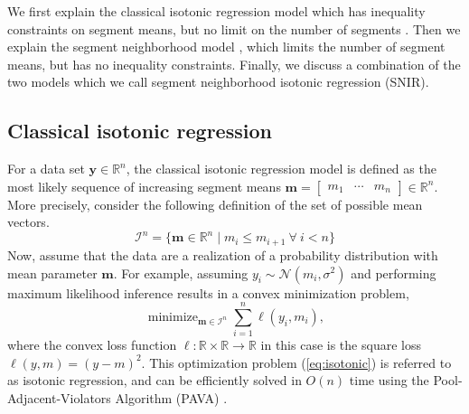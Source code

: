 \documentclass{article}
\DeclareMathOperator*{\Lik}{Lik}
\DeclareMathOperator*{\maximize}{maximize}
\DeclareMathOperator*{\minimize}{minimize}
\newcommand{\RR}{\mathbb R}
\begin{document}
We first explain the classical isotonic regression model which has
inequality constraints on segment means, but no limit on the number of
segments \citep{mair2009isotone}. Then we explain the segment
neighborhood model \citep{segment-neighborhood}, which limits the
number of segment means, but has no inequality constraints. Finally,
we discuss a combination of the two models which we call segment
neighborhood isotonic regression (SNIR).

\subsection{Classical isotonic regression}

For a data set $\mathbf y\in\RR^n$, the classical isotonic regression
model is defined as the most likely sequence of increasing segment
means $\mathbf m = \left[
\begin{array}{ccc}
  m_1& \cdots &m_n
\end{array}
\right]
\in\RR^n$. More precisely, consider the following definition
of the set of possible mean vectors.
\begin{equation}
  \mathcal I^n = \{\mathbf m\in\RR^n \mid m_i \leq m_{i+1} \ \forall\ i<n\}
\end{equation}
Now, assume that the data are a realization of a probability
distribution with mean parameter $\mathbf m$. For example, assuming
$y_i \sim \mathcal N(m_i, \sigma^2)$ 
and performing maximum likelihood inference results in a convex minimization problem,
\begin{equation}
  \label{eq:isotonic}
  \minimize_{\mathbf m\in\mathcal I^n} \sum_{i=1}^n \ell(y_i, m_i),
\end{equation}
where the convex loss function $\ell:\RR\times \RR\rightarrow\RR$ in
this case is the square loss $\ell(y, m) = (y-m)^2$. This optimization
problem (\ref{eq:isotonic}) is referred to as isotonic regression, and
can be efficiently solved in $O(n)$ time using the
Pool-Adjacent-Violators Algorithm (PAVA) \citep{isotonic-unifying}.
\end{document}
